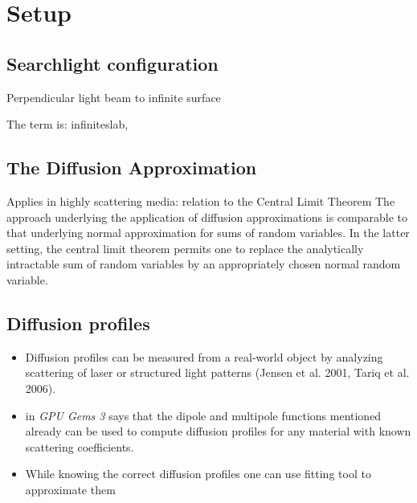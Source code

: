 \chapter{Setup}
\label{chapter:Setup}

\section{Searchlight configuration}
Perpendicular light beam to infinite surface \cite{Jacques1995}

The term is: \gls{infiniteslab},

\section{The Diffusion Approximation}
Applies in highly scattering media: relation to the Central Limit Theorem
The approach underlying the application of diffusion approximations is comparable to that underlying normal approximation for
sums of random variables. In the latter setting, the central limit theorem
permits one to replace the analytically intractable sum of random variables by
an appropriately chosen normal random variable. \cite{Donner:2006:TRI:1236937}

\section{Diffusion profiles}
\begin{itemize}
\item{Diffusion profiles can be measured from a real-world object
by analyzing scattering of laser or structured light patterns (Jensen et al. 2001, Tariq et al. 2006).}
\item{\cite{Nguyen:2007:GG:1407436} in \textit{GPU Gems 3} says that
the dipole and multipole functions mentioned already can be used to compute diffusion profiles
for any material with known scattering coefficients.}
\item{While knowing the correct diffusion profiles one can use fitting tool to approximate them \cite{Nguyen:2007:GG:1407436}}
\end{itemize}